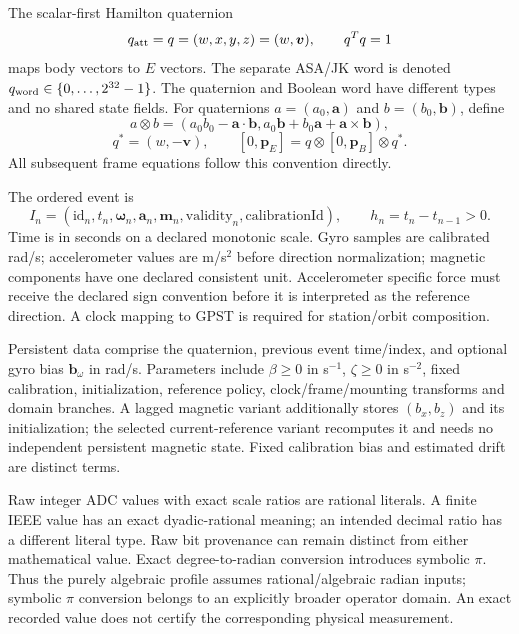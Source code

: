 The scalar-first Hamilton quaternion
\[
q_{\rm att}=q=(w,x,y,z)=(w,\boldsymbol v),\qquad q^Tq=1
\]
maps body vectors to $E$ vectors. The separate ASA/JK word is denoted
$q_{\rm word}\in\{0,\ldots,2^{32}-1\}$. The quaternion and Boolean word have
different types and no shared state fields. For quaternions $a=(a_0,\boldsymbol a)$
and $b=(b_0,\boldsymbol b)$, define
\[
a\otimes b=(a_0b_0-\boldsymbol a\cdot\boldsymbol b,
 a_0\boldsymbol b+b_0\boldsymbol a+\boldsymbol a\times\boldsymbol b),
\]
\[
q^*=(w,-\boldsymbol v),\qquad
[0,\boldsymbol p_E]=q\otimes[0,\boldsymbol p_B]\otimes q^*.
\]
All subsequent frame equations follow this convention directly.

The ordered event is
\[
I_n=(\mathrm{id}_n,t_n,\boldsymbol\omega_n,\boldsymbol a_n,
 \boldsymbol m_n,\mathrm{validity}_n,\mathrm{calibrationId}),
\qquad h_n=t_n-t_{n-1}>0.
\]
Time is in seconds on a declared monotonic scale. Gyro samples are calibrated
rad/s; accelerometer values are m/s$^2$ before direction normalization; magnetic
components have one declared consistent unit. Accelerometer specific force must
receive the declared sign convention before it is interpreted as the reference
direction. A clock mapping to GPST is required for station/orbit composition.

Persistent data comprise the quaternion, previous event time/index, and optional
gyro bias $\boldsymbol b_\omega$ in rad/s. Parameters include $\beta\ge0$ in
s$^{-1}$, $\zeta\ge0$ in s$^{-2}$, fixed calibration, initialization, reference
policy, clock/frame/mounting transforms and domain branches. A lagged magnetic
variant additionally stores $(b_x,b_z)$ and its initialization; the selected
current-reference variant recomputes it and needs no independent persistent
magnetic state. Fixed calibration bias and estimated drift are distinct terms.

Raw integer ADC values with exact scale ratios are rational literals. A finite
IEEE value has an exact dyadic-rational meaning; an intended decimal ratio has
a different literal type. Raw bit provenance can remain distinct from either
mathematical value. Exact degree-to-radian conversion introduces symbolic $\pi$.
Thus the purely algebraic profile assumes rational/algebraic radian inputs;
symbolic $\pi$ conversion belongs to an explicitly broader operator domain.
An exact recorded value does not certify the corresponding physical measurement.

